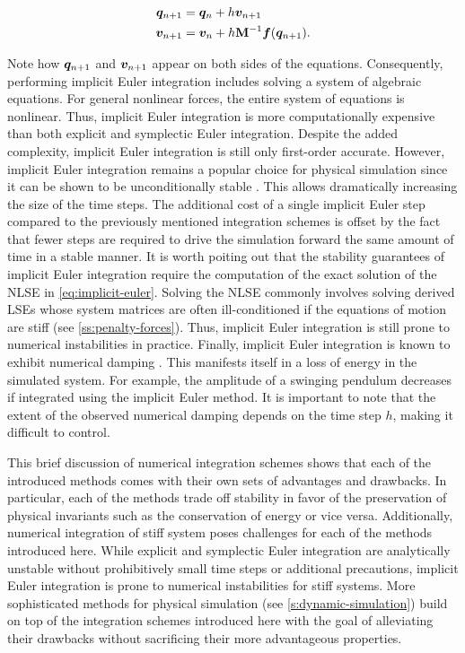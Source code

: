 \begin{align}
    \begin{split}\label{eq:implicit-euler}
        \bm{q}_{n+1} &= \bm{q}_n + h\bm{v}_{n+1}\\
        \bm{v}_{n+1} &= \bm{v}_n + h\mathbf{M}^{-1}\bm{f}(\bm{q}_{n+1}).
    \end{split}
\end{align}

\noindent Note how $\bm{q}_{n+1}$ and $\bm{v}_{n+1}$ appear on both sides of the equations. Consequently, performing implicit 
Euler integration includes solving a system of algebraic equations. For general nonlinear forces, the entire system of equations is nonlinear.
Thus, implicit Euler integration is more computationally expensive than both explicit and symplectic Euler integration. 
Despite the added complexity, implicit Euler integration is still only first-order accurate. However, implicit Euler integration 
remains a popular choice for physical simulation since it can be shown to be unconditionally stable \cite{chapra2005}. This allows 
dramatically increasing the size of the time steps. The additional cost of a single implicit Euler 
step compared to the previously mentioned integration schemes is offset by the fact that fewer steps are required to drive the 
simulation forward the same amount of time in a stable manner. It is worth poiting out that the stability guarantees of implicit Euler 
integration require the computation of the exact solution of the NLSE in \autoref{eq:implicit-euler}. Solving the NLSE commonly involves
solving derived LSEs whose system matrices are often ill-conditioned if the equations of motion are stiff (see \cref{ss:penalty-forces}). 
Thus, implicit Euler integration is still prone to numerical instabilities in practice. Finally, implicit Euler integration is known 
to exhibit numerical 
damping \cite{stern2006}. This manifests itself in a loss of energy in the simulated system. For example, the amplitude of a swinging 
pendulum decreases if integrated using the implicit Euler method. It is important to note that the extent of the observed numerical damping
depends on the time step $h$, making it difficult to control.

This brief discussion of numerical integration schemes shows that each of the introduced methods comes with their own sets of advantages and
drawbacks. In particular, each of the methods trade off stability in favor of the preservation of physical invariants such as the conservation
of energy or vice versa. Additionally, numerical integration of stiff system poses challenges for each of the methods introduced here. While
explicit and symplectic Euler integration are analytically unstable without prohibitively small time steps or additional
precautions, implicit Euler integration is prone to numerical instabilities for stiff systems. More sophisticated methods for physical 
simulation (see \cref{s:dynamic-simulation}) build on top of the integration schemes introduced here with the goal of alleviating their 
drawbacks without sacrificing their more advantageous properties. 

